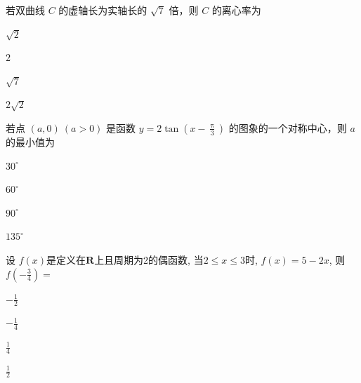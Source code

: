 \documentclass{exam-zh}
\begin{document}
\begin{question}
  若双曲线 $C$ 的虚轴长为实轴长的 $\sqrt{7}$ 倍，则 $C$ 的离心率为 \paren
  \begin{choices}
    \item $\sqrt{2}$
    \item $2$
    \item $\sqrt{7}$
    \item $2 \sqrt{2}$
  \end{choices}
\end{question}

\begin{question}
  若点 $(a, 0)~(a>0)$ 是函数 $y=2 \tan \left(x-\frac{\uppi}{3}\right)$ 的图象的一个对称中心，则 $a$ 的最小值为 \paren
  \begin{choices}
    \item $30^{\circ}$
    \item $60^{\circ}$
    \item $90^{\circ}$
    \item $135^{\circ}$
  \end{choices}
\end{question}

\begin{question}
  设 $f(x)$是定义在$\mathbf{R}$上且周期为2的偶函数, 当$2 \le x \le 3$时, $f(x)=5-2x$, 则$f\left(-\frac{3}{4}\right)=$ \paren
  \begin{choices}
    \item $-\frac{1}{2}$
    \item $-\frac{1}{4}$
    \item $\frac{1}{4}$
    \item $\frac{1}{2}$
  \end{choices}
\end{question}
\end{document}
